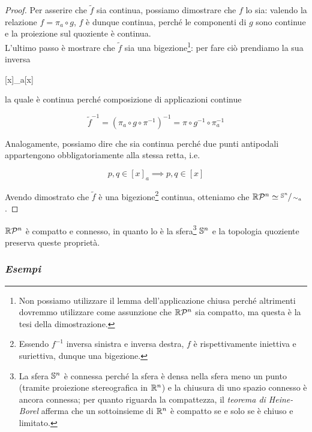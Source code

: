 \begin{proof}
	Per asserire che $ \tilde{f} $ sia continua, possiamo dimostrare che $ f $ lo sia: valendo la relazione $ f = \pi_{a} \circ g $, $ f $ è dunque continua, perché le componenti di $ g $ sono continue e la proiezione sul quoziente è continua. \\
	L'ultimo passo è mostrare che $ \tilde{f} $ sia una bigezione\footnote{%
		Non possiamo utilizzare il lemma dell'applicazione chiusa perché altrimenti dovremmo utilizzare come assunzione che $ \rp{n} $ sia compatto, ma questa è la tesi della dimostrazione.%
	}: per fare ciò prendiamo la sua inversa

		{}{}
		{[x]_{a}}{[x]}

	la quale è continua perché composizione di applicazioni continue
	
	\begin{equation}
		\tilde{f}^{-1} = (\pi_{a} \circ g \circ \pi^{-1})^{-1} = \pi \circ g^{-1} \circ \pi_{a}^{-1}
	\end{equation}

	Analogamente, possiamo dire che sia continua perché due punti antipodali appartengono obbligatoriamente alla stessa retta, i.e.
	
	\begin{equation}
		p,q \in [x]_{a} \implies p,q \in [x]
	\end{equation}

	Avendo dimostrato che $ \tilde{f} $ è una bigezione\footnote{%
		Essendo $ f^{-1} $ inversa sinistra e inversa destra, $ f $ è rispettivamente iniettiva e suriettiva, dunque una bigezione.%
	} continua, otteniamo che $ \rp{n} \simeq \sfrac{\S^{n}}{\sim_{a}} $.
\end{proof}

\begin{corollary}
	$ \rp{n} $ è compatto e connesso, in quanto lo è la sfera\footnote{%
		La sfera $ \S^{n} $ è connessa perché la sfera è densa nella sfera meno un punto (tramite proiezione stereografica in $ \R^{n} $) e la chiusura di uno spazio connesso è ancora connessa; per quanto riguarda la compattezza, il \textit{teorema di Heine-Borel} afferma che un sottoinsieme di $ \R^{n} $ è compatto se e solo se è chiuso e limitato.%
	} $ \S^{n} $ e la topologia quoziente preserva queste proprietà.
\end{corollary}

\subsubsection{\textit{Esempi}}

